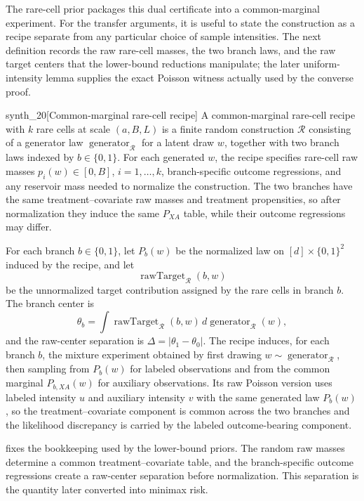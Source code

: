 \documentclass[11pt]{article}
\begin{document}
The rare-cell prior packages this dual certificate into a common-marginal experiment. For the transfer arguments, it is useful to state the construction as a recipe separate from any particular choice of sample intensities. The next definition records the raw rare-cell masses, the two branch laws, and the raw target centers that the lower-bound reductions manipulate; the later uniform-intensity lemma supplies the exact Poisson witness actually used by the converse proof.

\begin{definitionv}{synth_20}[Common-marginal rare-cell recipe]
A common-marginal rare-cell recipe with \(k\) rare cells at scale \((a,B,L)\) is a finite random construction \(\mathcal R\) consisting of a generator law \(\operatorname{generator}_{\mathcal R}\) for a latent draw \(w\), together with two branch laws indexed by \(b\in\{0,1\}\). For each generated \(w\), the recipe specifies rare-cell raw masses \(p_i(w)\in[0,B]\), \(i=1,\ldots,k\), branch-specific outcome regressions, and any reservoir mass needed to normalize the construction. The two branches have the same treatment--covariate raw masses and treatment propensities, so after normalization they induce the same \(P_{XA}\) table, while their outcome regressions may differ.

For each branch \(b\in\{0,1\}\), let \(P_b(w)\) be the normalized law on \([d]\times\{0,1\}^2\) induced by the recipe, and let
\[
\operatorname{rawTarget}_{\mathcal R}(b,w)
\]
be the unnormalized target contribution assigned by the rare cells in branch \(b\). The branch center is
\[
\theta_b=\int \operatorname{rawTarget}_{\mathcal R}(b,w)\,
d\operatorname{generator}_{\mathcal R}(w),
\]
and the raw-center separation is \(\Delta=|\theta_1-\theta_0|\). The recipe induces, for each branch \(b\), the mixture experiment obtained by first drawing
\(w\sim\operatorname{generator}_{\mathcal R}\), then sampling from \(P_b(w)\) for labeled observations and from the common marginal \(P_{b,XA}(w)\) for auxiliary observations. Its raw Poisson version uses labeled intensity \(u\) and auxiliary intensity \(v\) with the same generated law \(P_b(w)\), so the treatment--covariate component is common across the two branches and the likelihood discrepancy is carried by the labeled outcome-bearing component.
\end{definitionv}

 fixes the bookkeeping used by the lower-bound priors. The random raw masses determine a common treatment--covariate table, and the branch-specific outcome regressions create a raw-center separation before normalization. This separation is the quantity later converted into minimax risk.
\end{document}
